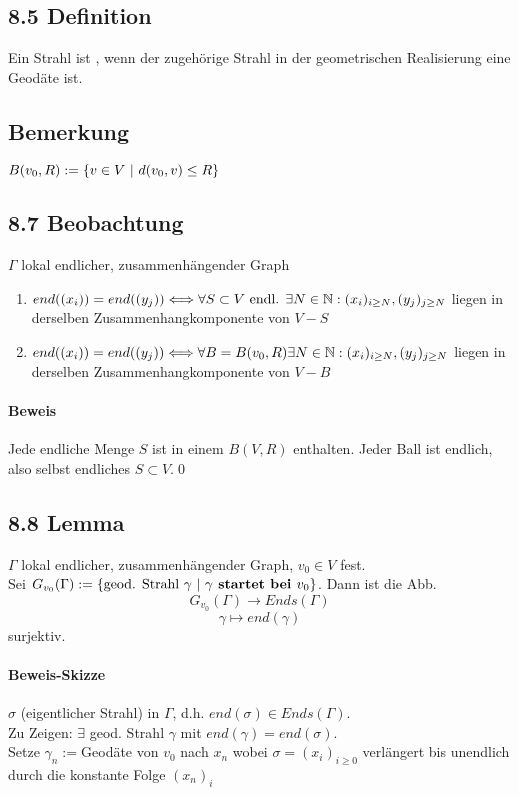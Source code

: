 \documentclass{article}
\begin{document}
\subsection{8.5 Definition}
Ein Strahl ist , wenn der zugehörige Strahl in der geometrischen Realisierung eine Geodäte ist.

\subsection{Bemerkung}
$B(v_0, R) := \set{v \in V}{d(v_0, v) \leq R}$

\subsection{8.7 Beobachtung}
$\Gamma$ lokal endlicher, zusammenhängender Graph
\begin{enumerate}
	\item $end((x_i)) = end((y_j)) \Longleftrightarrow \forall S \subset V \text{ endl. } \exists N \in \mathbb{N}: (x_i)_{i \geq N},(y_j)_{j \geq N}$ liegen in derselben Zusammenhangkomponente von $V-S$
	\item $end((x_i)) = end((y_j)) \Longleftrightarrow \forall B = B(v_0, R) \exists N \in \mathbb{N}: (x_i)_{i \geq N}, (y_j)_{j \geq N}$ liegen in derselben Zusammenhangkomponente von $V-B$
\end{enumerate}
\paragraph{Beweis}
Jede endliche Menge $S$ ist in einem $B(V,R)$ enthalten. Jeder Ball ist endlich, also selbst endliches $S \subset V$.\qed

\subsection{8.8 Lemma}
$\Gamma$ lokal endlicher, zusammenhängender Graph, $v_0 \in V$ fest.\\
Sei $G_{v_0}(\Gamma) := \set{\text{geod. Strahl } \gamma}{\gamma \df{ startet bei }v_0}$. Dann ist die Abb.
\[G_{v_0}(\Gamma ) \longrightarrow Ends(\Gamma) \]
\[\gamma \longmapsto end(\gamma) \]
surjektiv.

\paragraph{Beweis-Skizze}
$\sigma$ (eigentlicher Strahl) in $\Gamma$, d.h. $end(\sigma) \in Ends(\Gamma)$.\\
Zu Zeigen: $\exists$ geod. Strahl $\gamma$ mit $end(\gamma) = end(\sigma)$.\\
Setze $\gamma_n := $Geodäte von $v_0$ nach $x_n$ wobei $\sigma = (x_i)_{i\geq 0}$ verlängert bis unendlich durch die konstante Folge $(x_n)_i$\\
\end{document}
